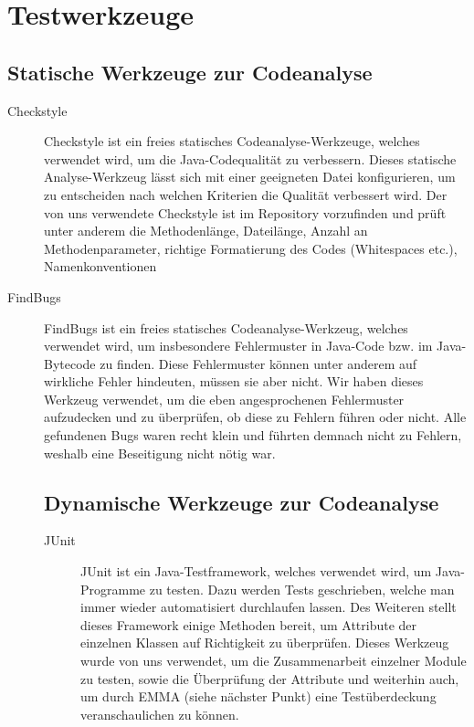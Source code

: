 \section{Testwerkzeuge}
\subsection{Statische Werkzeuge zur Codeanalyse}
\begin{description}
\item[Checkstyle ]Checkstyle ist ein freies statisches Codeanalyse-Werkzeuge, welches verwendet wird, um die Java-Codequalität zu verbessern.
	Dieses statische Analyse-Werkzeug lässt sich mit einer geeigneten Datei konfigurieren, um zu entscheiden nach welchen Kriterien
	die Qualität verbessert wird. Der von uns verwendete Checkstyle ist im Repository vorzufinden und prüft unter anderem die Methodenlänge, 
	Dateilänge, Anzahl an Methodenparameter, richtige Formatierung des Codes (Whitespaces etc.), Namenkonventionen 



\item[FindBugs] FindBugs ist ein freies statisches Codeanalyse-Werkzeug, welches verwendet wird, um insbesondere Fehlermuster in Java-Code bzw. im Java-Bytecode zu finden.
	Diese Fehlermuster können unter anderem auf wirkliche Fehler hindeuten, müssen sie aber nicht.
	Wir haben dieses Werkzeug verwendet, um die eben angesprochenen Fehlermuster aufzudecken und zu überprüfen, ob diese zu Fehlern
	führen oder nicht. Alle gefundenen Bugs waren recht klein und führten demnach nicht zu Fehlern, weshalb eine Beseitigung nicht nötig war.


\subsection{Dynamische Werkzeuge zur Codeanalyse}


\begin{description} 
\item[JUnit] JUnit ist ein Java-Testframework, welches verwendet wird, um Java-Programme zu testen. Dazu werden Tests geschrieben, welche man immer wieder automatisiert durchlaufen lassen.
	Des Weiteren stellt dieses Framework einige Methoden bereit, um Attribute der einzelnen Klassen auf Richtigkeit zu überprüfen.
	Dieses Werkzeug wurde von uns verwendet, um die Zusammenarbeit einzelner Module zu testen, sowie die Überprüfung der Attribute und weiterhin auch, um durch EMMA (siehe nächster Punkt) 
	eine Testüberdeckung veranschaulichen zu können.



\end{description}
\end{description}
